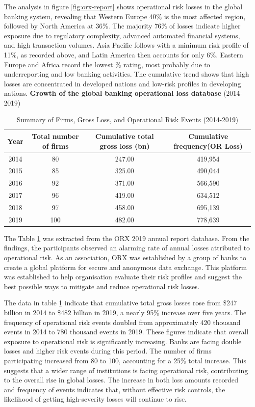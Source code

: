 The analysis in figure \ref{fig:orx-report} shows operational risk losses in the global banking system, revealing that Western Europe 40\% is the most affected region, followed by North America at 36\%. The majority 76\% of losses indicate higher exposure due to regulatory complexity, advanced automated financial systems, and high transaction volumes. Asia Pacific follows with a minimum risk profile of 11\%, as recorded above, and Latin America then accounts for only 6\%. Eastern Europe and Africa record the lowest \% rating, most probably due to underreporting and low banking activities. The cumulative trend shows that high losses are concentrated in developed nations and low-risk profiles in developing nations. 
\newpage
\textbf{Growth of the global banking operational loss database} (2014-2019)
\begin{table}[H]
    \centering
    \begin{tabular}{|c|c|c|c|}
        \hline
        Year & Total number of firms & Cumulative total gross loss (bn) & Cumulative frequency(OR Loss) \\
        \hline
        2014 & 80  & 247.00 & 419,954 \\
        2015 & 85  & 325.00 & 490,044 \\
        2016 & 92  & 371.00 & 566,590 \\
        2017 & 96  & 419.00 & 634,512 \\
        2018 & 97  & 458.00 & 695,139 \\
        2019 & 100 & 482.00 & 778,639 \\
        \hline
    \end{tabular}
    \caption{Summary of Firms, Gross Loss, and Operational Risk Events (2014-2019)}
    \label{tab:summary_table}
\end{table}
The Table \ref{tab:summary_table} was extracted from the ORX 2019 annual report database. From the findings, the participants observed an alarming rate of annual losses attributed to operational risk. As an association, ORX was established by a group of banks to create a global platform for secure and anonymous data exchange. This platform was established to help organisation evaluate their risk profiles and suggest the best possible ways to mitigate and reduce operational risk losses. 

The data in table \ref{tab:summary_table} indicate that cumulative total gross losses rose from \$247 billion in 2014 to \$482 billion in 2019, a nearly 95\% increase over five years. The frequency of operational risk events doubled from approximately 420 thousand events in 2014 to 780 thousand events in 2019. These figures indicate that overall exposure to operational risk is significantly increasing. Banks are facing double losses and higher risk events during this period. The number of firms participating increased from 80 to 100, accounting for a 25\% total increase. This suggests that a wider range of institutions is facing operational risk, contributing to the overall rise in global losses. The increase in both loss amounts recorded and frequency of events indicates that, without effective risk controls, the likelihood of getting high-severity losses will continue to rise.

